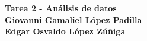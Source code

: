 \begin{center}
    \textbf{
        \textcolor{title}{Tarea 2 - Análisis de datos\vspace{0.2cm}\\
            Giovanni Gamaliel López Padilla\\
            Edgar Osvaldo López Zúñiga}}
\end{center}
